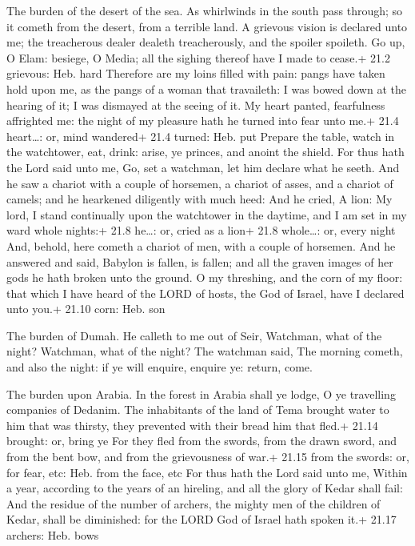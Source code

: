  The burden of the desert of the sea. As whirlwinds in the
south pass through; so it cometh from the desert, from a terrible land.
 A grievous vision is declared unto me; the treacherous
dealer dealeth treacherously, and the spoiler spoileth. Go up, O Elam:
besiege, O Media; all the sighing thereof have I made to cease.+ 21.2
grievous: Heb. hard  Therefore are my loins filled with
pain: pangs have taken hold upon me, as the pangs of a woman that
travaileth: I was bowed down at the hearing of it; I was dismayed at the
seeing of it.  My heart panted, fearfulness affrighted me:
the night of my pleasure hath he turned into fear unto me.+ 21.4
heart\ldots: or, mind wandered+ 21.4 turned: Heb. put 
Prepare the table, watch in the watchtower, eat, drink: arise, ye
princes, and anoint the shield.  For thus hath the Lord said
unto me, Go, set a watchman, let him declare what he seeth. 
And he saw a chariot with a couple of horsemen, a chariot of asses, and
a chariot of camels; and he hearkened diligently with much heed:
 And he cried, A lion: My lord, I stand continually upon the
watchtower in the daytime, and I am set in my ward whole nights:+ 21.8
he\ldots: or, cried as a lion+ 21.8 whole\ldots: or, every night
 And, behold, here cometh a chariot of men, with a couple of
horsemen. And he answered and said, Babylon is fallen, is fallen; and
all the graven images of her gods he hath broken unto the ground.
 O my threshing, and the corn of my floor: that which I
have heard of the LORD of hosts, the God of Israel, have I declared unto
you.+ 21.10 corn: Heb. son

 The burden of Dumah. He calleth to me out of Seir,
Watchman, what of the night? Watchman, what of the night? 
The watchman said, The morning cometh, and also the night: if ye will
enquire, enquire ye: return, come.

 The burden upon Arabia. In the forest in Arabia shall ye
lodge, O ye travelling companies of Dedanim.  The
inhabitants of the land of Tema brought water to him that was thirsty,
they prevented with their bread him that fled.+ 21.14 brought: or, bring
ye  For they fled from the swords, from the drawn sword,
and from the bent bow, and from the grievousness of war.+ 21.15 from the
swords: or, for fear, etc: Heb. from the face, etc  For
thus hath the Lord said unto me, Within a year, according to the years
of an hireling, and all the glory of Kedar shall fail:  And
the residue of the number of archers, the mighty men of the children of
Kedar, shall be diminished: for the LORD God of Israel hath spoken it.+
21.17 archers: Heb. bows

